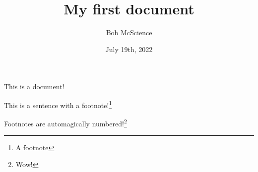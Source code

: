 \documentclass{article}
\title{My first document}
\author{Bob McScience}
\date{July 19th, 2022}
\begin{document}
\maketitle
	This is a document!
	
	This is a sentence with a footnote!\footnote{A footnote}
	
	Footnotes are automagically numbered!\footnote{Wow!}



\end{document}
